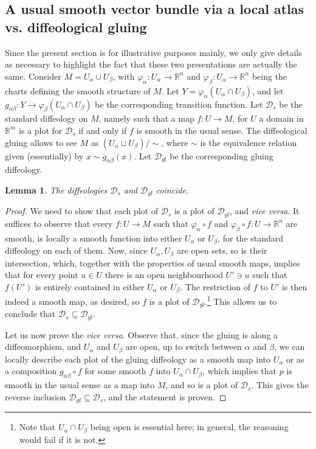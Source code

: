 \documentclass{article}
\newtheorem{lemma}{Lemma}[section]
\newcommand\matR{{\mathbb{R}}}
\newcommand\calD{{\mathcal D}}
\begin{document}
\subsection{A usual smooth vector bundle via a local atlas vs. diffeological gluing}

Since the present section is for illustrative purposes mainly, we only give details as necessary to highlight the fact that these two presentations are actually the same. Consider $M=U_{\alpha}\cup U_{\beta}$, 
with $\varphi_{\alpha}:U_{\alpha}\to\matR^n$ and $\varphi_{\beta}:U_{\alpha}\to\matR^n$ being the charts defining the smooth structure of $M$. Let $Y=\varphi_{\alpha}(U_{\alpha}\cap U_{\beta})$, and let 
$g_{\alpha\beta}:Y\to\varphi_{\beta}(U_{\alpha}\cap U_{\beta})$ be the corresponding transition function. Let $\calD_s$ be the standard diffeology on $M$, namely such that a map $f:U\to M$, for $U$ a domain 
in $\matR^m$ is a plot for $\calD_s$ if and only if $f$ is smooth in the usual sense. The diffeological gluing allows to see $M$ as $(U_{\alpha}\sqcup U_{\beta})/\sim$, where $\sim$ is the equivalence relation 
given (essentially) by $x\sim g_{\alpha\beta}(x)$. Let $\calD_{gl}$ be the corresponding gluing diffeology.

\begin{lemma}\label{gluing:equals:standard:case2:lem}
The diffeologies $\calD_s$ and $\calD_{gl}$ coincide.
\end{lemma}

\begin{proof}
We need to show that each plot of $\calD_s$ is a plot of $\calD_{gl}$, and \emph{vice versa}. It suffices to observe that every $f:U\to M$ such that $\varphi_{\alpha}\circ f$ and 
$\varphi_{\beta}\circ f:U\to\matR^n$ are smooth, is locally a smooth function into either $U_{\alpha}$ or $U_{\beta}$, for the standard diffeology on each of them. Now, since $U_{\alpha},U_{\beta}$ are
open sets, so is their intersection, which, together with the properties of usual smooth maps, implies that for every point $u\in U$ there is an open neighbourhood $U'\ni u$ such that $f(U')$ is entirely 
contained in either $U_{\alpha}$ or $U_{\beta}$. The restriction of $f$ to $U'$ is then indeed a smooth map, as desired, so $f$ is a plot of $\calD_{gl}$.\footnote{Note that $U_{\alpha}\cap U_{\beta}$ being 
open is essential here; in general, the reasoning would fail if it is not.} This allows us to conclude that $\calD_s\subseteq\calD_{gl}$.

Let us now prove the \emph{vice versa}. Observe that, since the gluing is along a diffeomorphism, and $U_{\alpha}$ and $U_{\beta}$ are open, up to switch between $\alpha$ and $\beta$, we can locally
describe each plot of the gluing diffeology as a smooth map into $U_{\alpha}$ or as a composition $g_{\alpha\beta}\circ f$ for some smooth $f$ into $U_{\alpha}\cap U_{\beta}$, which implies that $p$
is smooth in the usual sense as a map into $M$, and so is a plot of $\calD_s$. This gives the reverse inclusion $\calD_{gl}\subseteq\calD_s$, and the statement is proven.
\end{proof}
\end{document}
